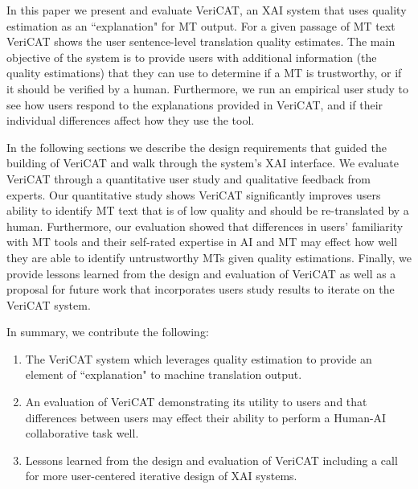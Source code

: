 In this paper we present and evaluate VeriCAT, an XAI system that uses quality estimation as an ``explanation" for MT output. For a given passage of MT text VeriCAT shows the user sentence-level translation quality estimates. The main objective of the system is to provide users with additional information (the quality estimations) that they can use to determine if a MT is trustworthy, or if it should be verified by a human. Furthermore, we run an empirical user study to see how users respond to the explanations provided in VeriCAT, and if their individual differences affect how they use the tool.  

In the following sections we describe the design requirements that guided the building of VeriCAT and walk through the system's XAI interface. We evaluate VeriCAT through a quantitative user study and qualitative feedback from experts. Our quantitative study shows VeriCAT significantly improves users ability to identify MT text that is of low quality and should be re-translated by a human. Furthermore, our evaluation showed that differences in users' familiarity with MT tools and their self-rated expertise in AI and MT may effect how well they are able to identify untrustworthy MTs given quality estimations. Finally, we provide lessons learned from the design and evaluation of VeriCAT as well as a proposal for future work that incorporates users study results to iterate on the VeriCAT system.

In summary, we contribute the following: 
\begin{enumerate}
    \item The VeriCAT system which leverages quality estimation to provide an element of ``explanation" to machine translation output. 
    \item An evaluation of VeriCAT demonstrating its utility to users and that differences between users may effect their ability to perform a Human-AI collaborative task well.
    \item Lessons learned from the design and evaluation of VeriCAT including a call for more user-centered iterative design of XAI systems. 
\end{enumerate}
